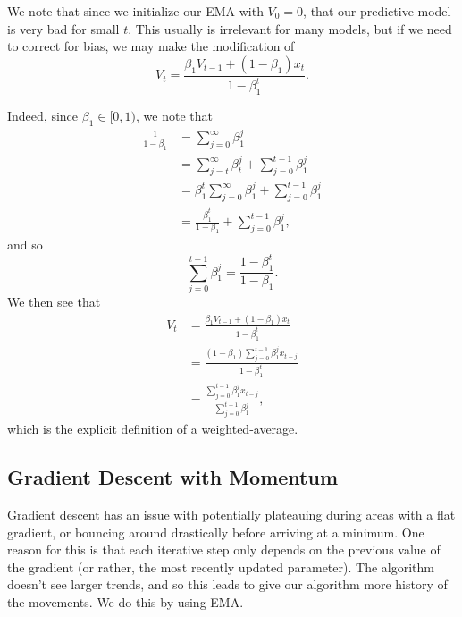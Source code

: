 \begin{remark}
	We note that since we initialize our EMA with $V_0=0$, that our predictive model is very bad for small $t$.  This usually is irrelevant for many models, but if we need to correct for bias, we may make the modification of
	$$V_t=\frac{\beta_1 V_{t-1}+(1-\beta_1)x_t}{1-\beta_1^t}.$$
	
	Indeed, since $\beta_1\in[0,1)$, we note that
\begin{align*}
	\frac{1}{1-\beta_1}&=\sum_{j=0}^\infty\beta_1^j\\
	&=\sum_{j=t}^\infty\beta_t^j+\sum_{j=0}^{t-1}\beta_1^j\\
	&=\beta_1^t\sum_{j=0}^\infty\beta_1^j+\sum_{j=0}^{t-1}\beta_1^j\\
	&=\frac{\beta_1^t}{1-\beta_1}+\sum_{j=0}^{t-1}\beta_1^j,
\end{align*}
and so
$$\sum_{j=0}^{t-1}\beta_1^j=\frac{1-\beta_1^t}{1-\beta_1}.$$
We then see that
\begin{align*}
	V_t&=\frac{\beta_1 V_{t-1}+(1-\beta_1)x_t}{1-\beta_1^t}\\
	&=\frac{(1-\beta_1)\sum_{j=0}^{t-1}\beta_1^jx_{t-j}}{1-\beta_1^t}\\
	&=\frac{\sum_{j=0}^{t-1}\beta_1^jx_{t-j}}{\sum_{j=0}^{t-1}\beta_1^j},
\end{align*}
which is the explicit definition of a weighted-average.
\end{remark}



\subsection{Gradient Descent with Momentum}
Gradient descent has an issue with potentially plateauing during areas with a flat gradient, or bouncing around drastically before arriving at a minimum.  One reason for this is that each iterative step only depends on the previous value of the gradient (or rather, the most recently updated parameter).  The algorithm doesn't see larger trends, and so this leads to give our algorithm more history of the movements.  We do this by using EMA.

